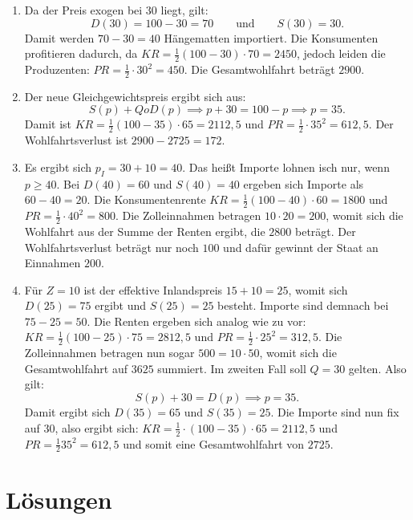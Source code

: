 \begin{solution}
	\begin{enumerate}
		\item Da der Preis exogen bei $30$ liegt, gilt:
		      \[
			      D(30) = 100-30 = 70 \qquad \text{und} \qquad S(30) = 30
			      .\]
		      Damit werden $70-30 = 40$ Hängematten importiert.
		      Die Konsumenten profitieren dadurch, da $KR = \frac{1}{2} (100-30) \cdot 70 = 2450$, jedoch leiden die Produzenten: $PR= \frac{1}{2} \cdot 30^2 = 450$.
		      Die Gesamtwohlfahrt beträgt $2900$.
		\item Der neue Gleichgewichtspreis ergibt sich aus:
		      \[
			      S(p) + Q o D(p) \implies p+30 = 100-p \implies p = 35
			      .\]
		      Damit ist $KR= \frac{1}{2} (100-35) \cdot 65 = 2112,5$ und $PR= \frac{1}{2} \cdot 35^2 = 612,5$.
		      Der Wohlfahrtsverlust ist $2900-2725 = 172$.
		\item Es ergibt sich $p_{I} = 30+10 = 40$. Das heißt Importe lohnen isch nur, wenn $p\ge 40$. Bei $D(40) = 60$ und $S(40)=40$ ergeben sich Importe als $60-40=20$.
		      Die Konsumentenrente $KR= \frac{1}{2} (100-40) \cdot 60= 1800$ und $PR=\frac{1}{2} \cdot 40^2 = 800$.
		      Die Zolleinnahmen betragen $10\cdot 20=200$, womit sich die Wohlfahrt aus der Summe der Renten ergibt, die $2800$ beträgt.
		      Der Wohlfahrtsverlust beträgt nur noch $100$ und dafür gewinnt der Staat an Einnahmen $200$.
		\item Für $Z=10$  ist der effektive Inlandspreis $15+10 = 25$, womit sich $D(25) = 75$ ergibt und $S(25)=25$ besteht. Importe sind demnach bei $75-25=50$.
		      Die Renten ergeben sich analog wie zu vor: $KR= \frac{1}{2} (100-25) \cdot 75 = 2812,5$ und $PR= \frac{1}{2} \cdot 25^2 = 312,5$.
		      Die Zolleinnahmen betragen nun sogar $500 = 10 \cdot 50$, womit sich die Gesamtwohlfahrt auf $3625$ summiert.
		      Im zweiten Fall soll $Q=30$ gelten. Also gilt:
		      \[
			      S(p) + 30 = D(p) \implies p = 35
			      .\]
		      Damit ergibt sich $D(35)=65$ und $S(35) = 25$. Die Importe sind nun fix auf $30$, also ergibt sich: $KR= \frac{1}{2} \cdot (100-35)\cdot 65 = 2112,5$ und $PR= \frac{1}{2} 35^2 = 612,5$ und somit eine Gesamtwohlfahrt von $2725$.
	\end{enumerate}
\end{solution}

\clearpage
\section{Lösungen}

\printsolutions
